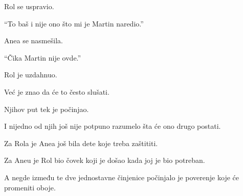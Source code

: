 \bigskip

Rol se uspravio.

``To baš i nije ono što mi je Martin naredio.''

Anea se nasmešila.

``Čika Martin nije ovde.''

\bigskip

Rol je uzdahnuo.

Već je znao da će to često slušati.

\bigskip

Njihov put tek je počinjao.

I nijedno od njih još nije potpuno razumelo šta će ono drugo postati.

Za Rola je Anea još bila dete koje treba zaštititi.

Za Aneu je Rol bio čovek koji je došao kada joj je bio potreban.

A negde između te dve jednostavne činjenice počinjalo je poverenje koje će promeniti oboje.
